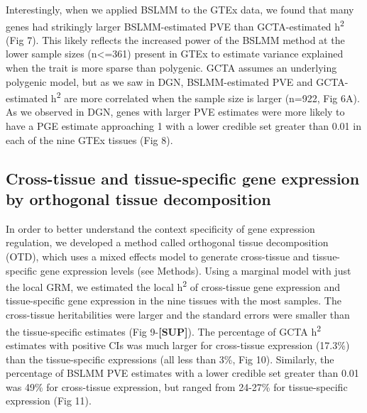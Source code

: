 \documentclass[]{article}
\begin{document}
Interestingly, when we applied BSLMM to the GTEx data, we found that
many genes had strikingly larger BSLMM-estimated PVE than GCTA-estimated
h\textsuperscript{2} (Fig 7). This likely reflects the increased power
of the BSLMM method at the lower sample sizes (n\textless{}=361) present
in GTEx to estimate variance explained when the trait is more sparse
than polygenic. GCTA assumes an underlying polygenic model, but as we
saw in DGN, BSLMM-estimated PVE and GCTA-estimated h\textsuperscript{2}
are more correlated when the sample size is larger (n=922, Fig 6A). As
we observed in DGN, genes with larger PVE estimates were more likely to
have a PGE estimate approaching 1 with a lower credible set greater than
0.01 in each of the nine GTEx tissues (Fig 8).

\subsection{Cross-tissue and tissue-specific gene expression by
orthogonal tissue
decomposition}\label{cross-tissue-and-tissue-specific-gene-expression-by-orthogonal-tissue-decomposition}

In order to better understand the context specificity of gene expression
regulation, we developed a method called orthogonal tissue decomposition
(OTD), which uses a mixed effects model to generate cross-tissue and
tissue-specific gene expression levels (see Methods). Using a marginal
model with just the local GRM, we estimated the local
h\textsuperscript{2} of cross-tissue gene expression and tissue-specific
gene expression in the nine tissues with the most samples. The
cross-tissue heritabilities were larger and the standard errors were
smaller than the tissue-specific estimates (Fig 9-\textbf{{[}SUP{]}}).
The percentage of GCTA h\textsuperscript{2} estimates with positive CIs
was much larger for cross-tissue expression (17.3\%) than the
tissue-specific expressions (all less than 3\%, Fig 10). Similarly, the
percentage of BSLMM PVE estimates with a lower credible set greater than
0.01 was 49\% for cross-tissue expression, but ranged from 24-27\% for
tissue-specific expression (Fig 11).
\end{document}

